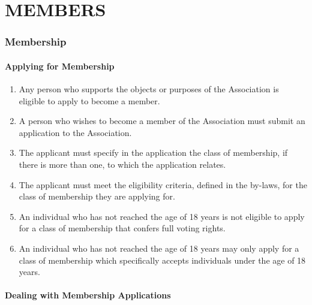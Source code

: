 \documentclass[../constitution.tex]{subfiles}
\begin{document}
\part{MEMBERS} \label{part-3-members}


\section{Membership} \label{division-1-membership}

\subsection{Applying for Membership} \label{applying-for-membership}

\begin{enumerate}
\item Any person who supports the objects or purposes of the Association is eligible to apply to become a member. \label{member-is-eligibile}
\item A person who wishes to become a member of the Association must submit an application to the Association. \label{member-must-submit-application}
\item The applicant must specify in the application the class of membership, if there is more than one, to which the application relates.
\item The applicant must meet the eligibility criteria, defined in the by-laws, for the class of membership they are applying for. \label{eligible-for-class-of-membership}
\item An individual who has not reached the age of 18 years is not eligible to apply for a class of membership that confers full voting rights. \label{eligible-for-voting-rights}
\item An individual who has not reached the age of 18 years may only apply for a class of membership which specifically accepts individuals under the age of 18 years. \label{members-under-18-years}
\end{enumerate}

\subsection{Dealing with Membership Applications}\label{dealing-with-membership-applications}
\end{document}
